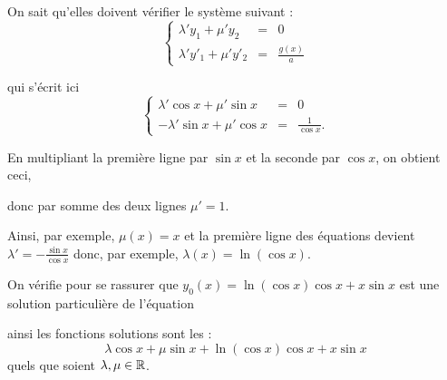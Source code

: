 \change

On sait qu'elles doivent vérifier le système suivant :
$$
\left\{\begin{array}{ccl}  
\lambda'y_1+\mu'y_2&=&0\\ 
\lambda'y'_1+\mu'y'_2&=& \frac{g(x)}{a}
\end{array}\right. $$

\change
qui s'écrit ici 
$$\left\{\begin{array}{ccl}  
\lambda' \cos x + \mu' \sin x &=&0\\ 
-\lambda' \sin x + \mu' \cos x &=& \frac{1}{\cos x}.
\end{array}\right. 
$$

\change
En multipliant la première ligne par $\sin x$ et la seconde par $\cos x$, on obtient
ceci,

\change
donc par somme des deux lignes $\mu'=1$.

\change
Ainsi, par exemple, $\mu(x) = x$ et la première ligne des équations devient 
$\lambda' = -\frac{\sin x}{\cos x}$ 
donc, par exemple, $\lambda(x) = \ln(\cos x)$.

\change
On vérifie pour se rassurer que $y_0(x) = \ln(\cos x) \cos x + x\sin x$ est une solution
particulière de l'équation 

\change
ainsi les fonctions solutions sont les :
$$\lambda \cos x  + \mu \sin x + \ln(\cos x) \cos x + x\sin x$$
quels que soient $\lambda,\mu\in \mathbb{R}$.


\diapo

\change





